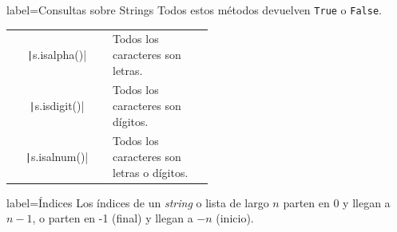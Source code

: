 \begin{contentbox}{label=Consultas sobre Strings}
    Todos estos métodos devuelven \texttt{True} o \texttt{False}.
    
    \begin{tabular}{C|p{0.5\linewidth}}
        \texttt|s.isalpha()| & Todos los caracteres son letras. \\
        \texttt|s.isdigit()| & Todos los caracteres son dígitos. \\
        \texttt|s.isalnum()| & Todos los caracteres son letras o dígitos. \\
    \end{tabular}
\end{contentbox}

\begin{contentbox}{label=Índices}
    Los índices de un \textit{string} o lista de largo $n$ parten en 0 y llegan a $n-1$, o parten en -1 (final) y llegan a $-n$ (inicio).
\end{contentbox}

